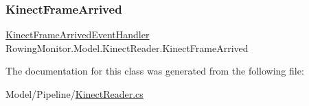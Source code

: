 \mbox{\label{class_rowing_monitor_1_1_model_1_1_kinect_reader_ae3bd87154cb1ed9a8fddf3d25db09a06}} 
\subsubsection{\texorpdfstring{Kinect\+Frame\+Arrived}{KinectFrameArrived}}
{\footnotesize\ttfamily \hyperlink{class_rowing_monitor_1_1_model_1_1_kinect_reader_ae6568e9b233e8878ac21662617702571}{Kinect\+Frame\+Arrived\+Event\+Handler} Rowing\+Monitor.\+Model.\+Kinect\+Reader.\+Kinect\+Frame\+Arrived}



The documentation for this class was generated from the following file\+:\begin{DoxyCompactItemize}
\item 
Model/\+Pipeline/\hyperlink{_kinect_reader_8cs}{Kinect\+Reader.\+cs}\end{DoxyCompactItemize}
